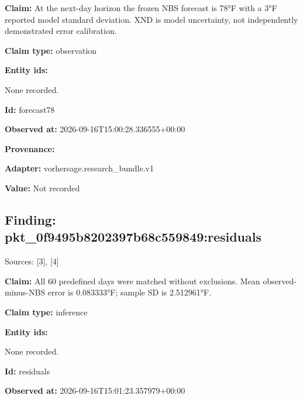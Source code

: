 \documentclass[11pt]{article}
\begin{document}
\par\noindent\textbf{Claim:} At the next-day horizon the frozen NBS forecast is 78°F with a 3°F reported model standard deviation. XND is model uncertainty, not independently demonstrated error calibration.

\par\noindent\textbf{Claim type:} observation

\par\noindent\textbf{Entity ids:} \par None recorded.

\par\noindent\textbf{Id:} forecast78

\par\noindent\textbf{Observed at:} 2026-09-16T1\hspace{0pt}5:00:28.3365\hspace{0pt}55+00:00

\par\noindent\textbf{Provenance:} \par \par\noindent\textbf{Adapter:} vorhersage.r\hspace{0pt}esearch\_bund\hspace{0pt}le.v1

\par\noindent\textbf{Value:} Not recorded

\subsection*{\textcolor{epdarkgreen}{Finding: pkt\_0f9495b8\hspace{0pt}202397b68c55\hspace{0pt}9849:residua\hspace{0pt}ls}}
Sources: [3], [4]


\par\noindent\textbf{Claim:} All 60 predefined days were matched without exclusions. Mean observed-minus-NBS error is 0.083333°F; sample SD is 2.512961°F.

\par\noindent\textbf{Claim type:} inference

\par\noindent\textbf{Entity ids:} \par None recorded.

\par\noindent\textbf{Id:} residuals

\par\noindent\textbf{Observed at:} 2026-09-16T1\hspace{0pt}5:01:23.3579\hspace{0pt}79+00:00
\end{document}
